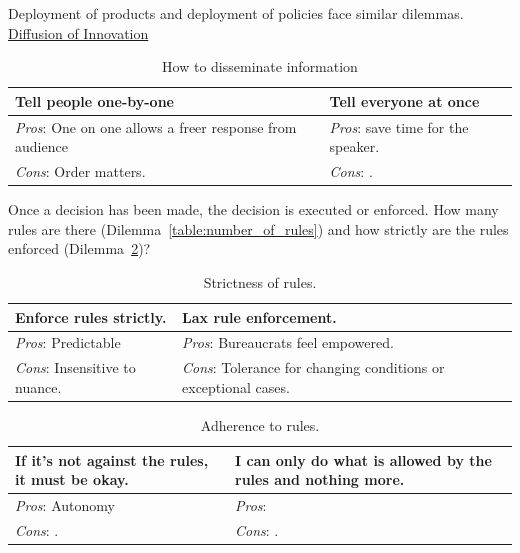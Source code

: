 Deployment of products and deployment of policies face similar dilemmas. \href{https://en.wikipedia.org/wiki/Diffusion_of_innovations}{Diffusion of Innovation}

\begin{center}
\begin{table}[ht]
\begin{tabular}{ | m{\dilemmatablewidth}| m{\dilemmatablewidth} | } 
  \hline
  \textbf{Tell people one-by-one} & 
  \textbf{Tell everyone at once} \\ 
  \hline
  \textit{Pros}: One on one allows a freer response from audience &
  \textit{Pros}: save time for the speaker. \\
  \hline
  \textit{Cons}: Order matters. & 
  \textit{Cons}: . \\  
  \hline
\end{tabular}
\caption{How to disseminate information
}
\label{table:disseminate_one-by-one}
\end{table}
\end{center}

Once a decision has been made, the decision is executed or enforced. How many rules are there (Dilemma~\ref{table:number_of_rules}) and
how strictly are the rules enforced (Dilemma~\ref{table:rule_strictness})?

\begin{center}
\begin{table}[ht]
\begin{tabular}{ | m{\dilemmatablewidth}| m{\dilemmatablewidth} | } 
  \hline
  \textbf{Enforce rules strictly.} & 
  \textbf{Lax rule enforcement.} \\ 
  \hline
  \textit{Pros}: Predictable &
  \textit{Pros}: Bureaucrats feel empowered. \\
  \hline
  \textit{Cons}: Insensitive to nuance. & 
  \textit{Cons}: Tolerance for changing conditions or exceptional cases.  \\  
  \hline
\end{tabular}
\caption{Strictness of rules.
}
\label{table:rule_strictness}
\end{table}
\end{center}

\begin{center}
\begin{table}[ht]
\begin{tabular}{ | m{\dilemmatablewidth}| m{\dilemmatablewidth} | } 
  \hline
  \textbf{If it's not against the rules, it must be okay.} & 
  \textbf{I can only do what is allowed by the rules and nothing more.} \\ 
  \hline
  \textit{Pros}: Autonomy &
  \textit{Pros}:  \\
  \hline
  \textit{Cons}: . & 
  \textit{Cons}: .  \\  
  \hline
\end{tabular}
\caption{Adherence to rules.
}
\label{table:rule_adherence}
\end{table}
\end{center}





